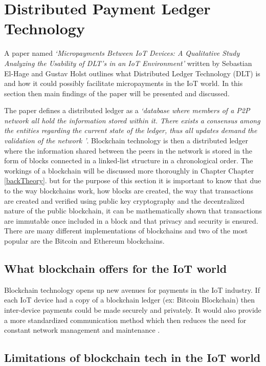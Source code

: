\section{Distributed Payment Ledger Technology}

A paper named \textit{‘Micropayments Between IoT Devices: A Qualitative Study Analyzing the Usability of DLT’s in an IoT Environment’} written by Sebastian El-Hage and Gustav Holst \parencite{micro_iot_devices} outlines what Distributed Ledger Technology (DLT) is and how it could possibly facilitate micropayments in the IoT world. In this section then main findings of the paper will be presented and discussed.

The paper defines a distributed ledger as a \textit{‘database where members of a P2P network all hold the information stored within it. There exists a consensus among the entities regarding the current state of the ledger, thus all updates demand the validation of the network ’}\parencite{micro_iot_devices}. Blockchain technology is then a distributed ledger where the information shared between the peers in the network is stored in the form of blocks connected in a linked-list structure in a chronological order. The workings of a blockchain will be discussed more thoroughly in Chapter Chapter \ref{backTheory}. but for the purpose of this section it is important to know that due to the way blockchains work, how blocks are created, the way that transactions are created and verified using public key cryptography and the decentralized nature of the public blockchain, it can be mathematically shown that transactions are immutable once included in a block and that privacy and security is ensured. There are many different implementations of blockchains and two of the most popular are the Bitcoin and Ethereum blockchains.

\subsection{What blockchain offers for the IoT world}

Blockchain technology opens up new avenues for payments in the IoT industry. If each IoT device had a copy of a blockchain ledger (ex: Bitcoin Blockchain) then inter-device payments could be made securely and privately. It would also provide a more standardized communication method which then reduces the need for constant network management and maintenance \parencite{iot_dev_integration}.

\subsection{Limitations of blockchain tech in the IoT world}

